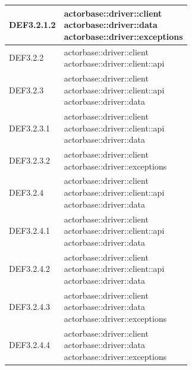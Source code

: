 \documentclass{scalatekids-article}
\begin{document}
\begin{longtable}[H]{|p{6cm}|p{11cm}|}
\hline
DEF3.2.1.2 & \multiLineCell[t]{actorbase::driver::client\\actorbase::driver::data\\actorbase::driver::exceptions\\}\\
\hline
DEF3.2.2 & \multiLineCell[t]{actorbase::driver::client\\actorbase::driver::client::api\\}\\
\hline
DEF3.2.3 & \multiLineCell[t]{actorbase::driver::client\\actorbase::driver::client::api\\actorbase::driver::data\\}\\
\hline
DEF3.2.3.1 & \multiLineCell[t]{actorbase::driver::client\\actorbase::driver::client::api\\actorbase::driver::data\\}\\
\hline
DEF3.2.3.2 & \multiLineCell[t]{actorbase::driver::client\\actorbase::driver::exceptions\\}\\
\hline
DEF3.2.4 & \multiLineCell[t]{actorbase::driver::client\\actorbase::driver::client::api\\actorbase::driver::data\\}\\
\hline
DEF3.2.4.1 & \multiLineCell[t]{actorbase::driver::client\\actorbase::driver::client::api\\actorbase::driver::data\\}\\
\hline
DEF3.2.4.2 & \multiLineCell[t]{actorbase::driver::client\\actorbase::driver::client::api\\actorbase::driver::data\\}\\
\hline
DEF3.2.4.3 & \multiLineCell[t]{actorbase::driver::client\\actorbase::driver::data\\actorbase::driver::exceptions\\}\\
\hline
DEF3.2.4.4 & \multiLineCell[t]{actorbase::driver::client\\actorbase::driver::data\\actorbase::driver::exceptions\\}\\

\end{longtable}
\end{document}
